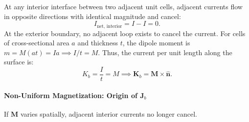 At any interior interface between two adjacent unit cells, adjacent currents flow in opposite directions with identical magnitude and cancel:
\begin{equation}
    I_{\text{net, interior}} = I - I = 0.
\end{equation}
At the exterior boundary, no adjacent loop exists to cancel the current. For cells of cross-sectional area $a$ and thickness $t$, the dipole moment is $m = M(at) = I a \implies I/t = M$. Thus, the current per unit length along the surface is:
\begin{equation}
    K_b = \frac{I}{t} = M \implies \bm{K}_b = \bm{M}\times \hat{\bm{n}}.
\end{equation}

\paragraph{Non-Uniform Magnetization: Origin of $\bm{J}_b$}

If $\bm{M}$ varies spatially, adjacent interior currents no longer cancel.

